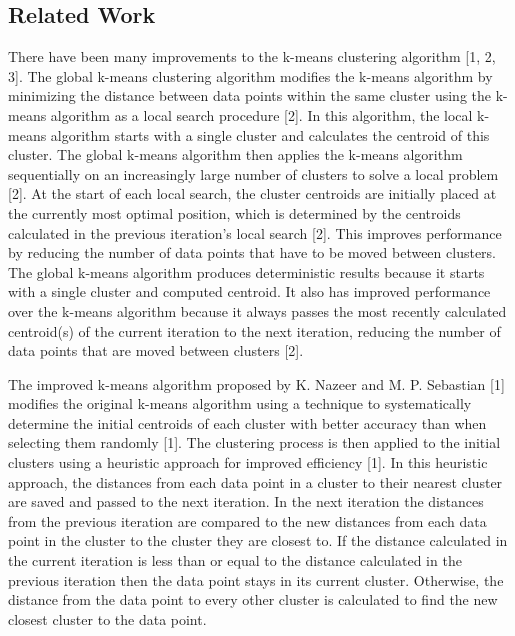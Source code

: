 \documentclass[conference,compsoc]{IEEEtran}
\begin{document}
\subsection{Related Work}

There have been many improvements to the k-means clustering algorithm [1, 2, 3]. The global k-means clustering algorithm modifies the k-means algorithm by minimizing the distance between data points within the same cluster using the k-means algorithm as a local search procedure [2]. In this algorithm, the local k-means algorithm starts with a single cluster and calculates the centroid of this cluster. The global k-means algorithm then applies the k-means algorithm sequentially on an increasingly large number of clusters to solve a local problem [2]. At the start of each local search, the cluster centroids are initially placed at the currently most optimal position, which is determined by the centroids calculated in the previous iteration’s local search [2]. This improves performance by reducing the number of data points that have to be moved between clusters. The global k-means algorithm produces deterministic results because it starts with a single cluster and computed centroid. It also has improved performance over the k-means algorithm because it always passes the most recently calculated centroid(s) of the current iteration to the next iteration, reducing the number of data points that are moved between clusters [2].

\par

The improved k-means algorithm proposed by K. Nazeer and M. P. Sebastian [1] modifies the original k-means algorithm using a technique to systematically determine the initial centroids of each cluster with better accuracy than when selecting them randomly [1]. The clustering process is then applied to the initial clusters using a heuristic approach for improved efficiency [1]. In this heuristic approach, the distances from each data point in a cluster to their nearest cluster are saved and passed to the next iteration. In the next iteration the distances from the previous iteration are compared to the new distances from each data point in the cluster to the cluster they are closest to. If the distance calculated in the current iteration is less than or equal to the distance calculated in the previous iteration then the data point stays in its current cluster. Otherwise, the distance from the data point to every other cluster is calculated to find the new closest cluster to the data point.
\end{document}
